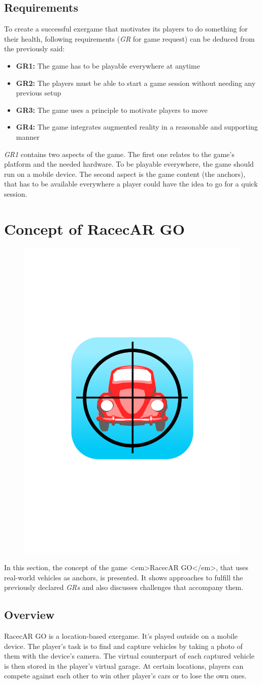 \subsection{Requirements}
To create a successful exergame that motivates its players to do something for their health, following requirements (\emph{GR} for game request) can be deduced from the previously said:
\begin{itemize}
  \item\textbf{GR1:} The game has to be playable everywhere at anytime
  \item\textbf{GR2:} The players must be able to start a game session without needing any previous setup
  \item\textbf{GR3:} The game uses a principle to motivate players to move
  \item\textbf{GR4:} The game integrates augmented reality in a reasonable and supporting manner
\end{itemize}
\emph{GR1} contains two aspects of the game. The first one relates to the game’s platform and the needed hardware. To be playable everywhere, the game should run on a mobile device. The second aspect is the game content (the anchors), that has to be available everywhere a player could have the idea to go for a quick session.


\section{Concept of RacecAR GO}
\begin{figure}[bth]
  \centering
        \includegraphics[width=.25\linewidth]{gfx/app_icon}
\end{figure}

In this section, the concept of the game <em>RacecAR GO</em>, that uses real-world vehicles as anchors, is presented. It shows approaches to fulfill the previously declared \emph{GRs} and also discusses challenges that accompany them.

\subsection{Overview}
RacecAR GO is a location-based exergame. It’s played outside on a mobile device. The player’s task is to find and capture vehicles by taking a photo of them with the device’s camera. The virtual counterpart of each captured vehicle is then stored in the player’s virtual garage. At certain locations, players can compete against each other to win other player’s cars or to lose the own ones.

